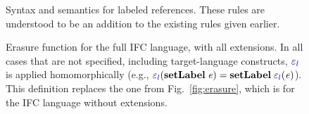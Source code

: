 \documentclass{llncs}
\newcommand{\Varid}[1]{\mathit{#1}}
\begin{document}
\begin{figure}
  \caption{Syntax and semantics for labeled references.  These rules are
    understood to be an addition to the existing rules given earlier.}
  \label{fig:labeled-refs}
  \end{figure}


\begin{figure}
  
  \caption{Erasure function for the full IFC language, with all extensions.
    In all cases that are not specified, including target-language constructs,
    \ensuremath{\varepsilon_{\ifc{l}}} is applied homomorphically
    (e.g., \ensuremath{\varepsilon_{\ifc{l}}(\mathbf{setLabel}\;\Varid{e})\mathrel{=}\mathbf{setLabel}\;\varepsilon_{\ifc{l}}(\Varid{e})}).
    This definition replaces the one from Fig.~\ref{fig:erasure}, which
    is for the IFC language without extensions.}
  \label{fig:erasure2}
\end{figure}
\end{document}
